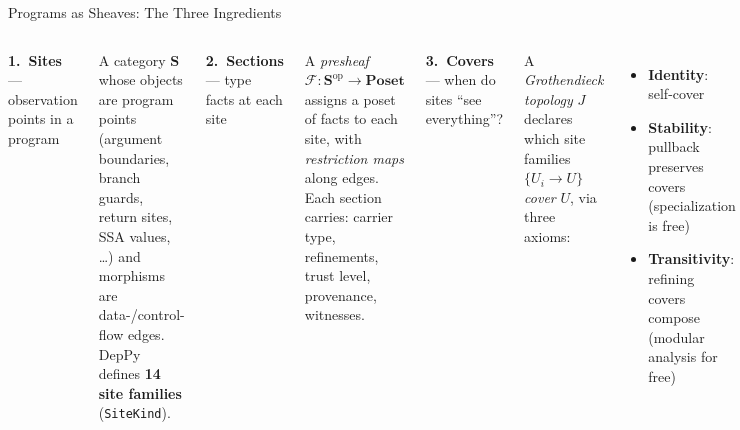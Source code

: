 \documentclass[aspectratio=169,10pt]{beamer}
\newcommand{\Sem}{\mathcal{F}}
\newcommand{\Cat}{\mathbf{S}}
\newcommand{\Poset}{\mathbf{Poset}}
\newcommand{\op}{\mathrm{op}}
\begin{document}
\begin{frame}{Programs as Sheaves: The Three Ingredients}

\begin{columns}[T]

\textbf{1.\ Sites} — observation points in a program

{\small A category $\Cat$ whose objects are program points
(argument boundaries, branch guards, return sites, SSA values, \ldots)
and morphisms are data-/control-flow edges.
DepPy defines \textbf{14 site families} (\texttt{SiteKind}).}

\vspace{0.3em}
\textbf{2.\ Sections} — type facts at each site

{\small A \emph{presheaf} $\Sem : \Cat^{\op} \to \Poset$ assigns a poset of facts
to each site, with \emph{restriction maps} along edges.
Each section carries: carrier type, refinements,
trust level, provenance, witnesses.}


\textbf{3.\ Covers} — when do sites ``see everything''?

{\small A \emph{Grothendieck topology} $J$ declares which site families
$\{U_i \to U\}$ \emph{cover} $U$, via three axioms:}
{\small
\begin{itemize}
  \item \textbf{Identity}: self-cover
  \item \textbf{Stability}: pullback preserves covers
        {\scriptsize (specialization is free)}
  \item \textbf{Transitivity}: refining covers compose
        {\scriptsize (modular analysis for free)}
\end{itemize}
}

\begin{center}
\end{center}

\end{columns}

\end{frame}
\end{document}

